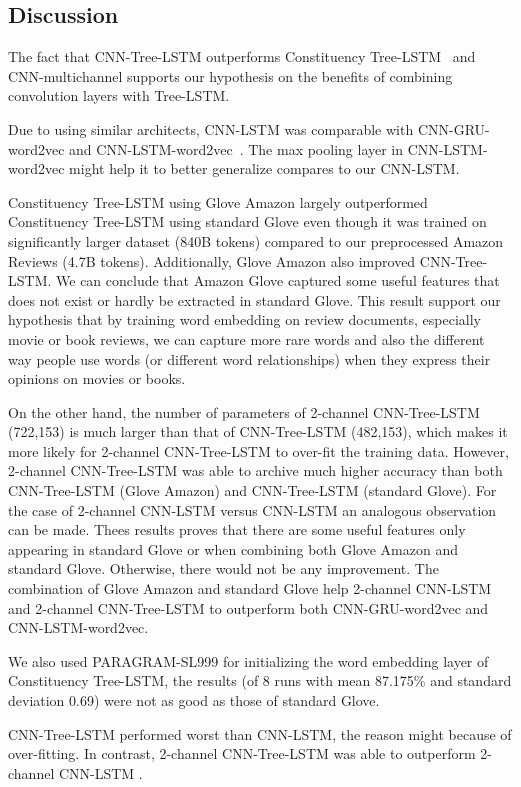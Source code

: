\subsection{Discussion}
The fact that CNN-Tree-LSTM outperforms Constituency Tree-LSTM~\cite{treeLSTM} and CNN-multichannel\cite{KimCNN} supports our hypothesis on the benefits of combining convolution layers with Tree-LSTM.

Due to using similar architects, CNN-LSTM was comparable with CNN-GRU-word2vec and CNN-LSTM-word2vec~\cite{cnn-rnn}.
The max pooling layer in CNN-LSTM-word2vec might help it to better generalize compares to our CNN-LSTM.

Constituency Tree-LSTM using Glove Amazon largely outperformed Constituency Tree-LSTM using standard Glove even though it was trained on significantly larger dataset (840B tokens) compared to our preprocessed Amazon Reviews (4.7B tokens).
Additionally, Glove Amazon also improved CNN-Tree-LSTM.
We can conclude that Amazon Glove captured some useful features that does not exist or hardly be extracted in standard Glove.
This result support our hypothesis that by training word embedding on review documents, especially movie or book reviews, we can capture more rare words and also the different way people use words (or different word relationships) when they express their opinions on movies or books.

On the other hand, the number of parameters of 2-channel CNN-Tree-LSTM (722,153) is much larger than that of CNN-Tree-LSTM (482,153), which makes it more likely for 2-channel CNN-Tree-LSTM to over-fit the training data.
However, 2-channel CNN-Tree-LSTM was able to archive much higher accuracy than both CNN-Tree-LSTM (Glove Amazon) and CNN-Tree-LSTM (standard Glove).
For the case of 2-channel CNN-LSTM versus CNN-LSTM an analogous observation can be made.
Thees results proves that there are some useful features only appearing in standard Glove or when combining both Glove Amazon and standard Glove.
Otherwise, there would not be any improvement.
The combination of Glove Amazon and standard Glove help 2-channel CNN-LSTM and 2-channel CNN-Tree-LSTM to outperform both CNN-GRU-word2vec and CNN-LSTM-word2vec.

We also used PARAGRAM-SL999 for initializing the word embedding layer of Constituency Tree-LSTM,
the results (of 8 runs with mean 87.175\% and standard deviation 0.69) were not as good as those of standard Glove.

CNN-Tree-LSTM performed worst than CNN-LSTM, the reason might because of over-fitting.
In contrast, 2-channel CNN-Tree-LSTM was able to outperform 2-channel CNN-LSTM .

